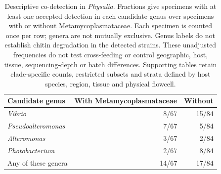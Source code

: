 \begin{table}[p]\centering\small
\begin{tabular}{lrr}\toprule
Candidate genus & With Metamycoplasmataceae & Without \\\midrule
\textit{Vibrio} & 8/67 & 15/84 \\
\textit{Pseudoalteromonas} & 7/67 & 5/84 \\
\textit{Alteromonas} & 3/67 & 2/84 \\
\textit{Photobacterium} & 2/67 & 8/84 \\
Any of these genera & 14/67 & 17/84 \\
\bottomrule\end{tabular}
\caption{Descriptive co-detection in \textit{Physalia}. Fractions give specimens with at least one accepted detection in each candidate genus over specimens with or without Metamycoplasmataceae. Each specimen is counted once per row; genera are not mutually exclusive. Genus labels do not establish chitin degradation in the detected strains. These unadjusted frequencies do not test cross-feeding or control geographic, host, tissue, sequencing-depth or batch differences. Supporting tables retain clade-specific counts, restricted subsets and strata defined by host species, region, tissue and physical flowcell.}
\label{tab:cooccurrence}\end{table}

